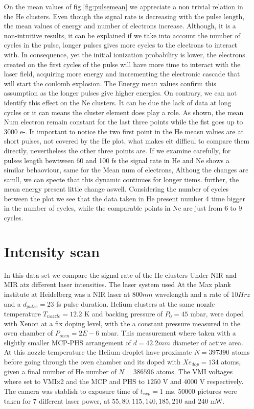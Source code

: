 On the mean values of fig \ref{fig:pulsemean} we appreciate a non trivial relation in the He clusters.     Even though the signal rate is decreasing with the pulse length, the mean values of energy and number of electrons increase. Although, it is a non-intuitive results, it can be explained if we take into account the number of cycles in the pulse, longer pulses gives more cycles to the electrons to interact with. In consequence, yet the initial ionization probability is lower, the electrons created on the first cycles of the pulse will have more time to interact with the laser field, acquiring more energy and incrementing the electronic cascade that will start the coulomb explosion. The Energy mean values confirm this assumption as the longer pulses give higher energies.
On contrary, we can not identify this effect on the Ne clusters. It can be due the lack of data at long cycles or it can means the cluster element does play a role. As shown, the mean Num electron remain constant for the last three points while the fist goes up to 3000 e-. It important to notice the two first point in the He measn values are at short pulses, not covered by the He plot, what makes eit difficul to compare them directly, nevertheless the other three points are. If we examine carefully, for  pulses length bewtween 60 and 100 fs the signal rate in He and Ne shows a similar behaoviour, same for the Mean num of electrons, Althoug the changes are samll, we can specte that this dynamic continues for longer tiems. further, the mean energy present little change aswell. Considering the number of cycles between the plot we see that the data taken in He present number 4 time bigger in the number of cycles, while the comparable points in Ne are just from 6 to 9 cycles. 


\section{Intensity scan}

In this data set we compare the signal rate of the He clusters Under NIR and MIR atz different laser intensities. The laser system used At the Max plank institute at Heidelberg was a NIR laser at $800nm$ wavelength and a rate of $10Hrz$ and a $d_{pulse}=23$ fs pulse duration. Helium clusters at the same nozzle temperature $T_{nozzle}=12.2$ K and  backing pressure of $P_{0}=45$ mbar, were doped with Xenon at a fix doping level, with the a constant pressure measured in the oven chamber of $P_{oven}=2E-6$ mbar. This measurement where taken with a slightly smaller MCP-PHS arrangement of $d=42.2mm$ diameter of active area. At this nozzle temperature the Helium droplet have proximate $N=397390$ atoms before going through the oven chamber and its doped with $Xe_{dop}=134$ atoms, given a final number of He number of $N=386596$ atoms. The VMI voltages where set to VMIx2 and the MCP and PHS to $1250$ V and $4000$ V respectively. The camera was stablish to exposure time of $t_{exp}=1$ ms. 50000 pictures were taken for 7 different laser power, at $55,80,115,140,185,210$ and $240$ mW. 

